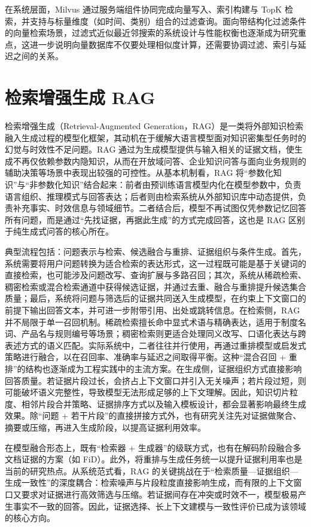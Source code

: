 在系统层面，Milvus 通过服务端组件协同完成向量写入、索引构建与 TopK 检索，并支持与标量维度（如时间、类别）组合的过滤查询。面向带结构化过滤条件的向量检索场景，过滤式近似最近邻搜索的系统设计与性能权衡也逐渐成为研究重点，这进一步说明向量数据库不仅要处理相似度计算，还需要协调过滤、索引与延迟之间的关系\cite{wang2021milvus,patel2024acorn}。

\section{检索增强生成 RAG}

检索增强生成（Retrieval-Augmented Generation，RAG）是一类将外部知识检索融入生成过程的模型化框架，其动机在于缓解大语言模型面对知识密集型任务时的幻觉与时效性不足问题\cite{lewis2020retrieval}。RAG 通过为生成模型提供与输入相关的证据文档，使生成不再仅依赖参数内隐知识，从而在开放域问答、企业知识问答与面向业务规则的辅助决策等场景中表现出较强的可控性。从基本机制看，RAG 将“参数化知识”与“非参数化知识”结合起来：前者由预训练语言模型内化在模型参数中，负责语言组织、推理模式与回答表达；后者则由检索系统从外部知识库中动态提供，负责补充事实、时效信息与领域细节。二者结合后，模型不再试图仅凭参数记忆回答所有问题，而是通过“先找证据，再据此生成”的方式完成回答，这也是 RAG 区别于纯生成式问答的核心所在\cite{lewis2020retrieval}。

典型流程包括：问题表示与检索、候选融合与重排、证据组织与条件生成。首先，系统需要将用户问题转换为适合检索的表达形式，这一过程既可能是基于关键词的直接检索，也可能涉及问题改写、查询扩展与多路召回；其次，系统从稀疏检索、稠密检索或混合检索通道中获得候选证据，并通过去重、融合与重排提升候选集合质量；最后，系统将问题与筛选后的证据共同送入生成模型，在约束上下文窗口的前提下输出回答文本，并可进一步附带引用、出处或跳转信息。在检索侧，RAG 并不局限于单一召回机制。稀疏检索擅长命中显式术语与精确表达，适用于制度名词、产品名与规则编号等场景；稠密检索则更适合处理同义改写、口语化表达与跨表述方式的语义匹配。实际系统中，二者往往并行使用，再通过重排模型或启发式策略进行融合，以在召回率、准确率与延迟之间取得平衡。这种“混合召回 + 重排”的结构也逐渐成为工程实践中的主流方案\cite{fan2024survey,huang2025survey}。在生成侧，证据组织方式直接影响回答质量。若证据片段过长，会挤占上下文窗口并引入无关噪声；若片段过短，则可能破坏语义完整性，导致模型无法形成足够的上下文理解。因此，知识切片粒度、相邻片段合并策略、证据排序方式以及输入模板设计，都会显著影响最终生成效果。除“问题 + 若干片段”的直接拼接方式外，也有研究关注先对证据做聚合、摘要或压缩，再进入生成阶段，以提高证据利用效率\cite{fan2024survey}。

在模型融合形态上，既有“检索器 + 生成器”的级联方式，也有在解码阶段融合多文档证据的方案（如 FiD\cite{izacard-grave-2021-leveraging}）。此外，将重排与生成任务统一以提升证据利用率也是当前的研究热点\cite{yu2024rankrag}。从系统范式看，RAG 的关键挑战在于“检索质量—证据组织—生成一致性”的深度耦合：检索噪声与片段粒度直接影响生成，而有限的上下文窗口又要求对证据进行高效筛选与压缩。若证据间存在冲突或时效不一，模型极易产生事实不一致的回答。因此，证据选择、长上下文建模与一致性评价已成为该领域的核心方向\cite{fan2024survey,huang2025survey}。

